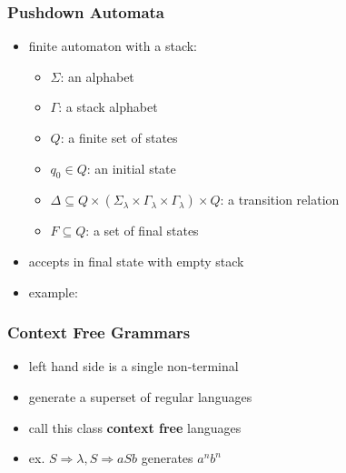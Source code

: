 \documentclass{beamer}
\begin{document}

\begin{frame}
\frametitle{Pushdown Automata}
\begin{itemize}
\item finite automaton with a stack:
  \begin{itemize}
  \item $\Sigma$: an alphabet
  \item $\Gamma$: a stack alphabet
  \item $Q$: a finite set of states
  \item $q_0 \in Q$: an initial state
  \item $\Delta \subseteq Q \times (\Sigma_\lambda \times \Gamma_\lambda \times
    \Gamma_\lambda) \times Q$: a transition relation
  \item $F \subseteq Q$: a set of final states
  \end{itemize}
\item accepts in final state with empty stack
  \item example:
\end{itemize}
\begin{figure}
  \centering
{}
  \end{figure}
\end{frame}


\begin{frame}
\frametitle{Context Free Grammars}
\begin{itemize}
\item left hand side is a single non-terminal
\item generate a superset of regular languages
\item call this class \textbf{context free} languages
\item ex. $S \Rightarrow \lambda, S \Rightarrow aSb$ generates $a^nb^n$
\end{itemize}
\end{frame}
\end{document}
